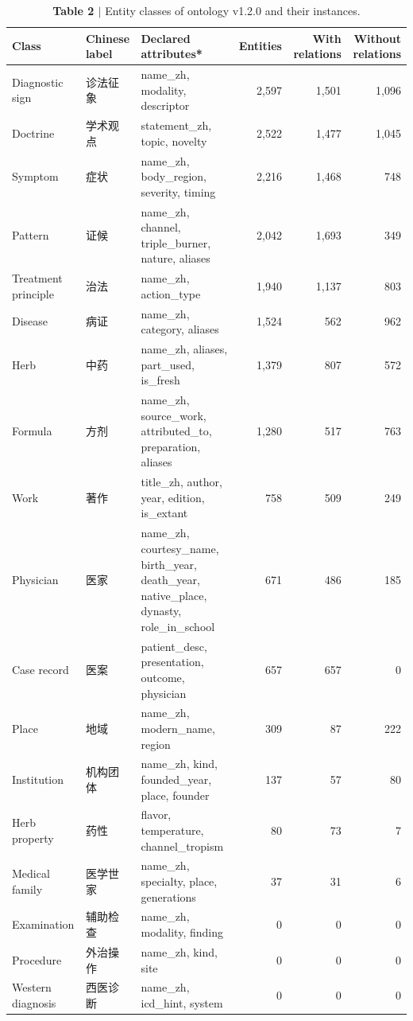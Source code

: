 \begin{table}[p]
\footnotesize
\begin{threeparttable}
\caption{\textbf{Table 2 $|$} Entity classes of ontology v1.2.0 and their instances.}
\begin{tabularx}{\linewidth}{llXrrr}
\toprule
Class & Chinese label & Declared attributes* & Entities & With relations & Without relations \\
\midrule
Diagnostic sign & 诊法征象 & name\_zh, modality, descriptor & 2,597 & 1,501 & 1,096 \\
Doctrine & 学术观点 & statement\_zh, topic, novelty & 2,522 & 1,477 & 1,045 \\
Symptom & 症状 & name\_zh, body\_region, severity, timing & 2,216 & 1,468 & 748 \\
Pattern & 证候 & name\_zh, channel, triple\_burner, nature, aliases & 2,042 & 1,693 & 349 \\
Treatment principle & 治法 & name\_zh, action\_type & 1,940 & 1,137 & 803 \\
Disease & 病证 & name\_zh, category, aliases & 1,524 & 562 & 962 \\
Herb & 中药 & name\_zh, aliases, part\_used, is\_fresh & 1,379 & 807 & 572 \\
Formula & 方剂 & name\_zh, source\_work, attributed\_to, preparation, aliases & 1,280 & 517 & 763 \\
Work & 著作 & title\_zh, author, year, edition, is\_extant & 758 & 509 & 249 \\
Physician & 医家 & name\_zh, courtesy\_name, birth\_year, death\_year, native\_place, dynasty, role\_in\_school & 671 & 486 & 185 \\
Case record & 医案 & patient\_desc, presentation, outcome, physician & 657 & 657 & 0 \\
Place & 地域 & name\_zh, modern\_name, region & 309 & 87 & 222 \\
Institution & 机构团体 & name\_zh, kind, founded\_year, place, founder & 137 & 57 & 80 \\
Herb property & 药性 & flavor, temperature, channel\_tropism & 80 & 73 & 7 \\
Medical family & 医学世家 & name\_zh, specialty, place, generations & 37 & 31 & 6 \\
Examination \textdagger{} & 辅助检查 & name\_zh, modality, finding & 0 & 0 & 0 \\
Procedure \textdagger{} & 外治操作 & name\_zh, kind, site & 0 & 0 & 0 \\
Western diagnosis \textdagger{} & 西医诊断 & name\_zh, icd\_hint, system & 0 & 0 & 0 \\

\end{tabularx}
\end{threeparttable}
\end{table}
